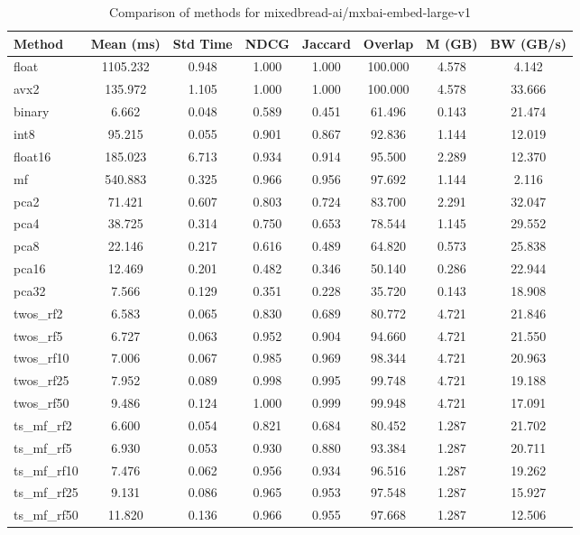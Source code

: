 \begin{table}[h]
  \centering
  \begin{tabular}{lccccccc}
    \hline
    Method       & Mean (ms) & Std Time & NDCG  & Jaccard & Overlap & M (GB) & BW (GB/s) \\
    \hline
    float        & 1105.232  & 0.948    & 1.000 & 1.000   & 100.000 & 4.578  & 4.142     \\
    avx2         & 135.972   & 1.105    & 1.000 & 1.000   & 100.000 & 4.578  & 33.666    \\
    binary       & 6.662     & 0.048    & 0.589 & 0.451   & 61.496  & 0.143  & 21.474    \\
    int8         & 95.215    & 0.055    & 0.901 & 0.867   & 92.836  & 1.144  & 12.019    \\
    float16      & 185.023   & 6.713    & 0.934 & 0.914   & 95.500  & 2.289  & 12.370    \\
    mf           & 540.883   & 0.325    & 0.966 & 0.956   & 97.692  & 1.144  & 2.116     \\
    pca2         & 71.421    & 0.607    & 0.803 & 0.724   & 83.700  & 2.291  & 32.047    \\
    pca4         & 38.725    & 0.314    & 0.750 & 0.653   & 78.544  & 1.145  & 29.552    \\
    pca8         & 22.146    & 0.217    & 0.616 & 0.489   & 64.820  & 0.573  & 25.838    \\
    pca16        & 12.469    & 0.201    & 0.482 & 0.346   & 50.140  & 0.286  & 22.944    \\
    pca32        & 7.566     & 0.129    & 0.351 & 0.228   & 35.720  & 0.143  & 18.908    \\
    twos\_rf2    & 6.583     & 0.065    & 0.830 & 0.689   & 80.772  & 4.721  & 21.846    \\
    twos\_rf5    & 6.727     & 0.063    & 0.952 & 0.904   & 94.660  & 4.721  & 21.550    \\
    twos\_rf10   & 7.006     & 0.067    & 0.985 & 0.969   & 98.344  & 4.721  & 20.963    \\
    twos\_rf25   & 7.952     & 0.089    & 0.998 & 0.995   & 99.748  & 4.721  & 19.188    \\
    twos\_rf50   & 9.486     & 0.124    & 1.000 & 0.999   & 99.948  & 4.721  & 17.091    \\
    ts\_mf\_rf2  & 6.600     & 0.054    & 0.821 & 0.684   & 80.452  & 1.287  & 21.702    \\
    ts\_mf\_rf5  & 6.930     & 0.053    & 0.930 & 0.880   & 93.384  & 1.287  & 20.711    \\
    ts\_mf\_rf10 & 7.476     & 0.062    & 0.956 & 0.934   & 96.516  & 1.287  & 19.262    \\
    ts\_mf\_rf25 & 9.131     & 0.086    & 0.965 & 0.953   & 97.548  & 1.287  & 15.927    \\
    ts\_mf\_rf50 & 11.820    & 0.136    & 0.966 & 0.955   & 97.668  & 1.287  & 12.506    \\
    \hline
  \end{tabular}
  \caption{Comparison of methods for mixedbread-ai/mxbai-embed-large-v1}
  \label{tab:method-comparison-1024}
\end{table}

